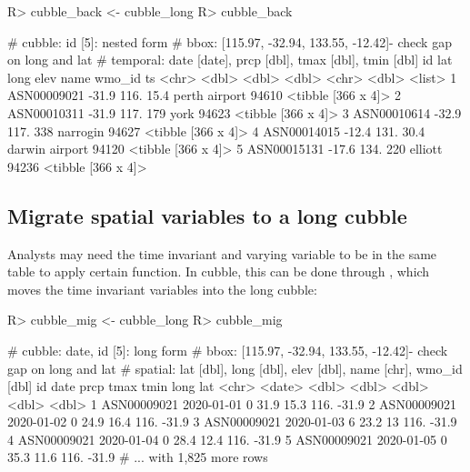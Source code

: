 \documentclass[
]{jss}
\begin{document}
\begin{CodeChunk}
\begin{CodeInput}
R> cubble_back <- cubble_long %
R> cubble_back
\end{CodeInput}
\begin{CodeOutput}
# cubble:   id [5]: nested form
# bbox:     [115.97, -32.94, 133.55, -12.42]- check gap on long and lat
# temporal: date [date], prcp [dbl], tmax [dbl], tmin [dbl]
  id            lat  long  elev name           wmo_id ts                
  <chr>       <dbl> <dbl> <dbl> <chr>           <dbl> <list>            
1 ASN00009021 -31.9  116.  15.4 perth airport   94610 <tibble [366 x 4]>
2 ASN00010311 -31.9  117. 179   york            94623 <tibble [366 x 4]>
3 ASN00010614 -32.9  117. 338   narrogin        94627 <tibble [366 x 4]>
4 ASN00014015 -12.4  131.  30.4 darwin airport  94120 <tibble [366 x 4]>
5 ASN00015131 -17.6  134. 220   elliott         94236 <tibble [366 x 4]>
\end{CodeOutput}
\end{CodeChunk}

\hypertarget{migrate-spatial-variables-to-a-long-cubble}{%
\subsection{Migrate spatial variables to a long
cubble}\label{migrate-spatial-variables-to-a-long-cubble}}

Analysts may need the time invariant and varying variable to be in the
same table to apply certain function. In cubble, this can be done
through , which moves the time invariant variables into
the long cubble:

\begin{CodeChunk}
\begin{CodeInput}
R> cubble_mig <- cubble_long %
R> cubble_mig
\end{CodeInput}
\begin{CodeOutput}
# cubble:  date, id [5]: long form
# bbox:    [115.97, -32.94, 133.55, -12.42]- check gap on long and lat
# spatial: lat [dbl], long [dbl], elev [dbl], name [chr], wmo_id [dbl]
  id          date        prcp  tmax  tmin  long   lat
  <chr>       <date>     <dbl> <dbl> <dbl> <dbl> <dbl>
1 ASN00009021 2020-01-01     0  31.9  15.3  116. -31.9
2 ASN00009021 2020-01-02     0  24.9  16.4  116. -31.9
3 ASN00009021 2020-01-03     6  23.2  13    116. -31.9
4 ASN00009021 2020-01-04     0  28.4  12.4  116. -31.9
5 ASN00009021 2020-01-05     0  35.3  11.6  116. -31.9
# ... with 1,825 more rows
\end{CodeOutput}
\end{CodeChunk}
\end{document}

